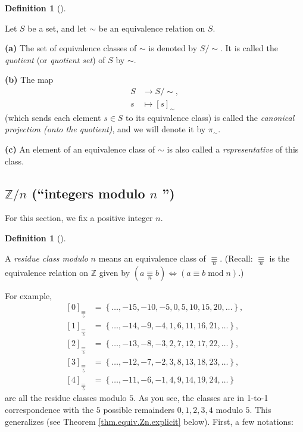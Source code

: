 \documentclass[numbers=enddot,12pt,final,onecolumn,notitlepage]{scrartcl}%
\numberwithin{exer}{subsection}
\theoremstyle{definition}
\newtheorem{defi}[theo]{Definition}
\newenvironment{definition}[1][]
{\begin{defi}[#1]\begin{leftbar}}
{\end{leftbar}\end{defi}}
\begin{document}
\begin{definition}
Let $S$ be a set, and let $\sim$ be an equivalence relation on $S$.

\textbf{(a)} The set of equivalence classes of $\sim$ is denoted by $S/\sim$.
It is called the \textit{quotient} (or \textit{quotient set}) of $S$ by $\sim$.

\textbf{(b)} The map%
\begin{align*}
S  &  \rightarrow S/\sim,\\
s  &  \mapsto\left[  s\right]  _{\sim}%
\end{align*}
(which sends each element $s\in S$ to its equivalence class) is called the
\textit{canonical projection (onto the quotient)}, and we will denote it by
$\pi_{\sim}$.

\textbf{(c)} An element of an equivalence class of $\sim$ is also called a
\textit{representative} of this class.
\end{definition}

\subsection{$\mathbb{Z}/n$ (\textquotedblleft integers modulo $n$%
\textquotedblright)}

For this section, we fix a positive integer $n$.

\begin{definition}
A \textit{residue class modulo}\textbf{ }$n$ means an equivalence class of
$\underset{n}{\equiv}$. (Recall: $\underset{n}{\equiv}$ is the equivalence
relation on $\mathbb{Z}$ given by $\left(  a\underset{n}{\equiv}b\right)
\Longleftrightarrow\left(  a\equiv b\operatorname{mod}n\right)  $.)
\end{definition}

For example,%
\begin{align*}
\left[  0\right]  _{\underset{5}{\equiv}}  &  =\left\{  \ldots
,-15,-10,-5,0,5,10,15,20,\ldots\right\}  ,\\
\left[  1\right]  _{\underset{5}{\equiv}}  &  =\left\{  \ldots
,-14,-9,-4,1,6,11,16,21,\ldots\right\}  ,\\
\left[  2\right]  _{\underset{5}{\equiv}}  &  =\left\{  \ldots
,-13,-8,-3,2,7,12,17,22,\ldots\right\}  ,\\
\left[  3\right]  _{\underset{5}{\equiv}}  &  =\left\{  \ldots
,-12,-7,-2,3,8,13,18,23,\ldots\right\}  ,\\
\left[  4\right]  _{\underset{5}{\equiv}}  &  =\left\{  \ldots
,-11,-6,-1,4,9,14,19,24,\ldots\right\}
\end{align*}
are all the residue classes modulo $5$. As you see, the classes are in 1-to-1
correspondence with the $5$ possible remainders $0,1,2,3,4$ modulo $5$. This
generalizes (see Theorem \ref{thm.equiv.Zn.explicit} below). First, a few notations:
\end{document}
